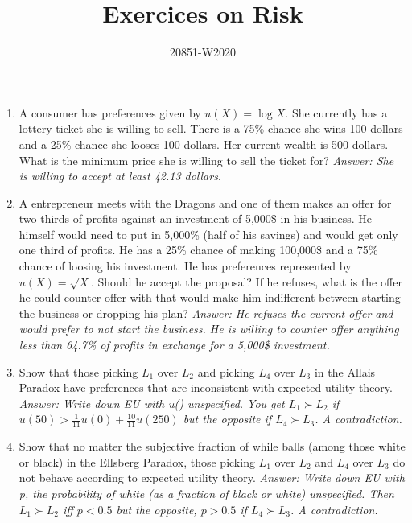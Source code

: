 \documentclass[11pt, oneside,french]{article}   	%
\title{Exercices on Risk}
\author{20851-W2020}
\date{}							%
\begin{document}
\maketitle

\begin{enumerate}
    \item A consumer has preferences given by $u(X) = \log X$. She currently has a lottery ticket she is willing to sell. There is a 75\% chance she wins 100 dollars and a 25\% chance she looses 100 dollars. Her current wealth is 500 dollars. What is the minimum price she is willing to sell the ticket for? \textit{Answer: She is willing to accept at least 42.13 dollars}. 
    \item A entrepreneur meets with the Dragons and one of them makes an offer for two-thirds of profits against an investment of 5,000\$ in his business. He himself would need to put in 5,000\% (half of his savings) and would get only one third of profits. He has a 25\% chance of making 100,000\$ and a 75\% chance of loosing his investment. He has preferences represented by $u(X) = \sqrt{X}$. Should he accept the proposal? If he refuses, what is the offer he could counter-offer with that would make him indifferent between starting the business or dropping his plan? \textit{Answer: He refuses the current offer and would prefer to not start the business. He is willing to counter offer anything less than 64.7\% of profits in exchange for a 5,000\$ investment.} 
    \item Show that those picking $L_1$ over $L_2$ and picking $L_4$ over $L_3$ in the Allais Paradox have preferences that are inconsistent with expected utility theory. \textit{Answer: Write down EU with u() unspecified. You get $L_1 \succ L_2$ if $u(50)>\frac{1}{11}u(0) + \frac{10}{11}u(250)$ but the opposite if $L_4 \succ L_3$. A contradiction.}
    \item Show that no matter the subjective fraction of while balls (among those white or black) in the Ellsberg Paradox, those picking $L_1$ over $L_2$ and $L_4$ over $L_3$ do not behave according to expected utility theory. \textit{Answer: Write down EU with p, the probability of white (as a fraction of black or white) unspecified. Then $L_1 \succ L_2$ iff $p<0.5$ but the opposite, $p>0.5$ if $L_4 \succ L_3$. A contradiction.}

\end{enumerate}
\end{document}
